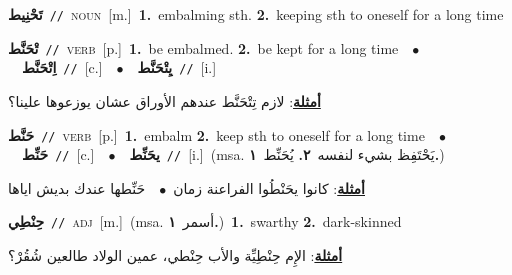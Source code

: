 \documentclass[10pt,a4paper,twoside]{article} %
\begin{document}
\begin{multicols}{2}
{\setlength\topsep{0pt}\textbf{\foreignlanguage{arabic}{تَحْنِيط}}\ {\color{gray}\texttt{//}\color{black}}\ \textsc{noun}\ [m.]\ \textbf{1.}~embalming sth.  \textbf{2.}~keeping sth to oneself for a long time\ } \vspace{2mm}

{\setlength\topsep{0pt}\textbf{\foreignlanguage{arabic}{تْحَنَّط}}\ {\color{gray}\texttt{//}\color{black}}\ \textsc{verb}\ [p.]\ \textbf{1.}~be embalmed.  \textbf{2.}~be kept for a long time\ \ $\bullet$\ \ \setlength\topsep{0pt}\textbf{\foreignlanguage{arabic}{اِتْحَنَّط}}\ {\color{gray}\texttt{//}\color{black}}\ [c.]\ \ $\bullet$\ \ \setlength\topsep{0pt}\textbf{\foreignlanguage{arabic}{يِتْحَنَّط}}\ {\color{gray}\texttt{//}\color{black}}\ [i.]\  \begin{flushright}\color{gray}\foreignlanguage{arabic}{\textbf{\underline{\foreignlanguage{arabic}{أمثلة}}}: لازم تِتْحَنَّط عندهم الأوراق عشان يوزعوها علينا؟}\end{flushright}\color{black}} \vspace{2mm}

{\setlength\topsep{0pt}\textbf{\foreignlanguage{arabic}{حَنَّط}}\ {\color{gray}\texttt{//}\color{black}}\ \textsc{verb}\ [p.]\ \textbf{1.}~embalm  \textbf{2.}~keep sth to oneself for a long time\ \ $\bullet$\ \ \setlength\topsep{0pt}\textbf{\foreignlanguage{arabic}{حَنِّط}}\ {\color{gray}\texttt{//}\color{black}}\ [c.]\ \ $\bullet$\ \ \setlength\topsep{0pt}\textbf{\foreignlanguage{arabic}{يحَنِّط}}\ {\color{gray}\texttt{//}\color{black}}\ [i.]\ \color{gray}(msa. \foreignlanguage{arabic}{يَحْتَفِظ بشيء لنفسه}~\foreignlanguage{arabic}{\textbf{٢.}}  \foreignlanguage{arabic}{يُحَنِّط}~\foreignlanguage{arabic}{\textbf{١.}})\color{black}\  \begin{flushright}\color{gray}\foreignlanguage{arabic}{\textbf{\underline{\foreignlanguage{arabic}{أمثلة}}}: كانوا يحَنْطُوا الفراعنة زمان\ $\bullet$\ \  حَنِّطها عندك بديش اياها}\end{flushright}\color{black}} \vspace{2mm}

{\setlength\topsep{0pt}\textbf{\foreignlanguage{arabic}{حِنْطِي}}\ {\color{gray}\texttt{//}\color{black}}\ \textsc{adj}\ [m.]\ \color{gray}(msa. \foreignlanguage{arabic}{أسمر}~\foreignlanguage{arabic}{\textbf{١.}})\color{black}\ \textbf{1.}~swarthy  \textbf{2.}~dark-skinned\  \begin{flushright}\color{gray}\foreignlanguage{arabic}{\textbf{\underline{\foreignlanguage{arabic}{أمثلة}}}: الإِم حِنْطِيِّة والأب حِنْطي، عمين الولاد طالعين شُقُرْ؟}\end{flushright}\color{black}} \vspace{2mm}


\end{multicols}
\end{document}
